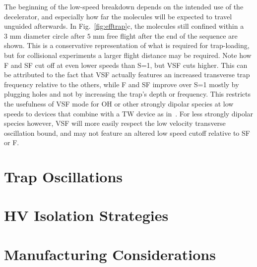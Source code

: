 The beginning of the low-speed breakdown depends on the intended use of the decelerator, and especially how far the molecules will be expected to travel unguided afterwards. 
In Fig.~\ref{fig:efftrap}c, the molecules still confined within a $3\text{ mm}$ diameter circle after $5\text{ mm}$ free flight after the end of the sequence are shown. 
This is a conservative representation of what is required for trap-loading, but for collisional experiments a larger flight distance may be required.
Note how F and SF cut off at even lower speeds than S=1, but VSF cuts higher. 
This can be attributed to the fact that VSF actually features an increased transverse trap frequency relative to the others, while F and SF improve over S=1 mostly by plugging holes and not by increasing the trap's depth or frequency.
This restricts the usefulness of VSF mode for OH or other strongly dipolar species at low speeds to devices that combine with a TW device as in~\cite{Quintero-Perez2013}.
For less strongly dipolar species however, VSF will more easily respect the low velocity transverse oscillation bound, and may not feature an altered low speed cutoff relative to SF or F.


\section{Trap Oscillations}

\section{HV Isolation Strategies}

\section{Manufacturing Considerations}